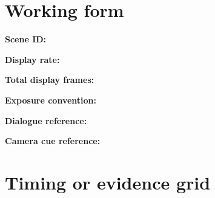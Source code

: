 \documentclass[10pt,letterpaper]{article}
\begin{document}
\section{Working form}
\noindent\textbf{Scene ID:}\quad\hrulefill\par\vspace{10pt}
\noindent\textbf{Display rate:}\quad\hrulefill\par\vspace{10pt}
\noindent\textbf{Total display frames:}\quad\hrulefill\par\vspace{10pt}
\noindent\textbf{Exposure convention:}\quad\hrulefill\par\vspace{10pt}
\noindent\textbf{Dialogue reference:}\quad\hrulefill\par\vspace{10pt}
\noindent\textbf{Camera cue reference:}\quad\hrulefill\par\vspace{10pt}\section{Timing or evidence grid}
\end{document}
